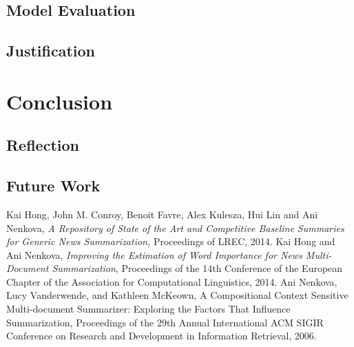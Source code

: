 \documentclass{article}
\begin{document}
\subsection{Model Evaluation}
\subsection{Justification}

\section{Conclusion}
\subsection{Reflection}
\subsection{Future Work}

\begin{thebibliography}{99}
    Kai Hong, John M. Conroy, Benoit Favre, Alex Kulesza, Hui Lin and Ani Nenkova,
    \emph{A Repository of State of the Art and Competitive Baseline Summaries for Generic News Summarization,}
    Proceedings of LREC, 2014.
    Kai Hong and Ani Nenkova,
    \emph{Improving the Estimation of Word Importance for News Multi-Document Summarization},
    Proceedings of the 14th Conference of the European Chapter of the Association for Computational Linguistics, 2014.
    Ani Nenkova, Lucy Vanderwende, and Kathleen McKeown,
    A Compositional Context Sensitive Multi-document Summarizer: Exploring the Factors That Influence Summarization,
    Proceedings of the 29th Annual International ACM SIGIR Conference on Research and Development in Information Retrieval, 2006.
\end{thebibliography}
\end{document}
